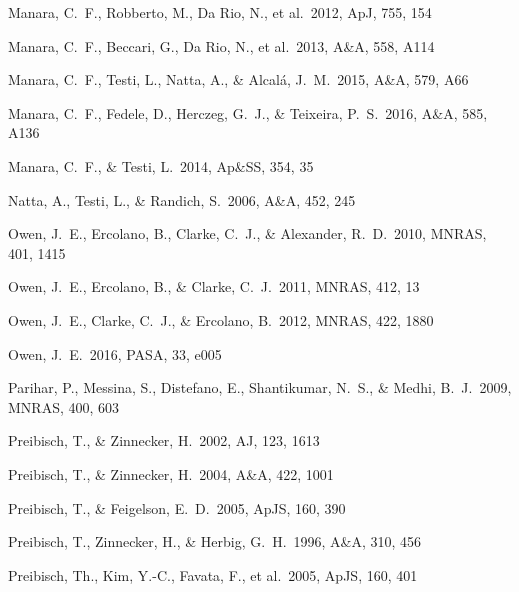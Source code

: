 \documentclass[10pt,fleqn,twoside,a4paper]{article}
\newcommand*\aap{A\&A}
\newcommand*\aj{AJ}
\newcommand*\apj{ApJ}
\newcommand*\apjs{ApJS}
\newcommand*\apss{Ap\&SS}
\newcommand*\mnras{MNRAS}
\newcommand*\pasa{PASA}
\begin{document}
\begin{thebibliography}{}
 Manara, C.~F., Robberto, M., Da Rio, N., et al.\ 2012, \apj, 755, 154

 Manara, C.~F., Beccari, G., Da Rio, N., et al.\ 2013, \aap, 558, A114 

 Manara, C.~F., Testi, L., Natta, A., \& Alcal{\'a}, J.~M.\ 2015, \aap, 579, A66

 Manara, C.~F., Fedele, D., Herczeg, G.~J., \& Teixeira, P.~S.\ 2016, \aap, 585, A136 


 Manara, C.~F., \& Testi, L.\ 2014, \apss, 354, 35 

 Natta, A., Testi, L., \& Randich, S.\ 2006, \aap, 452, 245


 Owen, J.~E., Ercolano, B., Clarke, C.~J., \& Alexander, R.~D.\ 2010, \mnras, 401, 1415

 Owen, J.~E., Ercolano, B., \& Clarke, C.~J.\ 2011, \mnras, 412, 13

 Owen, J.~E., Clarke, C.~J., \& Ercolano, B.\ 2012, \mnras, 422, 1880 

 Owen, J.~E.\ 2016, \pasa, 33, e005 

 Parihar, P., Messina, S., Distefano, E., Shantikumar, N.~S., \& Medhi, B.~J.\ 2009, \mnras, 400, 603 

 Preibisch, T., \& Zinnecker, H.\ 2002, \aj, 123, 1613 

 Preibisch, T., \& Zinnecker, H.\ 2004, \aap, 422, 1001

 Preibisch, T., \& Feigelson, E.~D.\ 2005, \apjs, 160, 390

 Preibisch, T., Zinnecker, H., \& Herbig, G.~H.\ 1996, \aap, 310, 456

 Preibisch, Th., 
Kim, Y.-C., Favata, F., et al.\ 2005, \apjs, 160, 401



\end{thebibliography}
\end{document}
